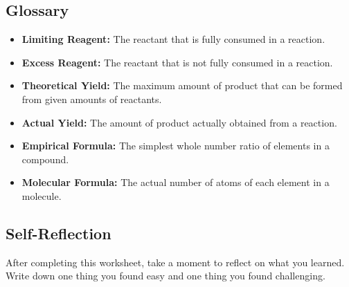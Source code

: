 \documentclass[12pt]{article}
\begin{document}
\subsection*{Glossary}
\begin{itemize}
    \item \textbf{Limiting Reagent:} The reactant that is fully consumed in a reaction.
    \item \textbf{Excess Reagent:} The reactant that is not fully consumed in a reaction.
    \item \textbf{Theoretical Yield:} The maximum amount of product that can be formed from given amounts of reactants.
    \item \textbf{Actual Yield:} The amount of product actually obtained from a reaction.
    \item \textbf{Empirical Formula:} The simplest whole number ratio of elements in a compound.
    \item \textbf{Molecular Formula:} The actual number of atoms of each element in a molecule.
\end{itemize}

\subsection*{Self-Reflection}
After completing this worksheet, take a moment to reflect on what you learned. Write down one thing you found easy and one thing you found challenging.
\end{document}

